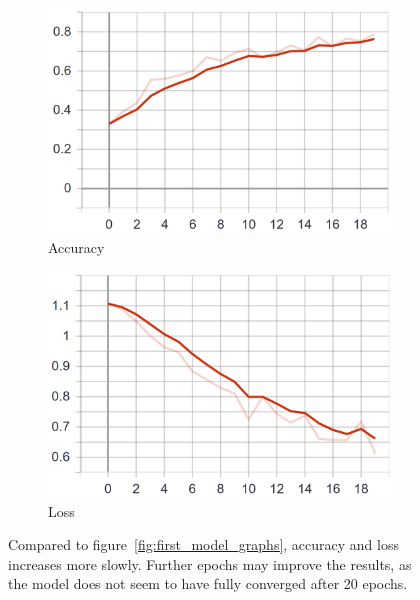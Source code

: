 \begin{figure}
    \centering
    \begin{subfigure}[b]{0.4\textwidth}
        \includegraphics[width=\textwidth]{images/first_model_data_augmentation_acc.png}
        \caption{Accuracy}
        \label{fig:first_model_data_augmentation_acc}
    \end{subfigure}
    \begin{subfigure}[b]{0.4\textwidth}
        \includegraphics[width=\textwidth]{images/first_model_data_augmentation_loss.png}
        \caption{Loss}
        \label{fig:first_model_data_augmentation_loss}
    \end{subfigure}
    \caption{Compared to figure~\ref{fig:first_model_graphs}, accuracy and loss increases more slowly. Further epochs may improve the results, as the model does not seem to have fully converged after 20 epochs.}
    \label{fig:first_model_data_augmentation_graphs}
\end{figure}

